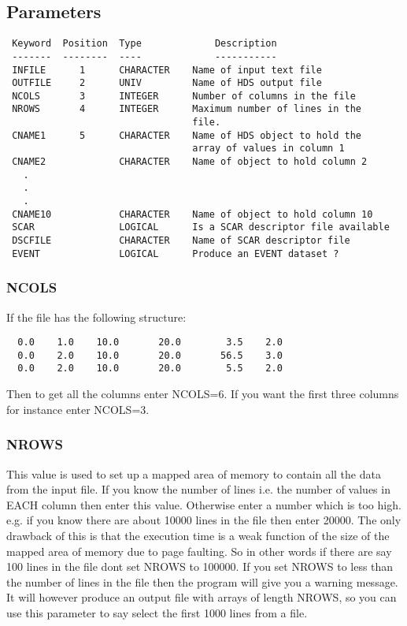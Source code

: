 \documentclass{book}
\renewcommand{\_}{{\tt\char'137}}     %
\begin{document}
\subsection{Parameters}
\begin{verbatim}
 Keyword  Position  Type             Description
 -------  --------  ----             -----------
 INFILE      1      CHARACTER    Name of input text file
 OUTFILE     2      UNIV         Name of HDS output file
 NCOLS       3      INTEGER      Number of columns in the file
 NROWS       4      INTEGER      Maximum number of lines in the
                                 file.
 CNAME1      5      CHARACTER    Name of HDS object to hold the
                                 array of values in column 1
 CNAME2             CHARACTER    Name of object to hold column 2
   .
   .
   .
 CNAME10            CHARACTER    Name of object to hold column 10
 SCAR               LOGICAL      Is a SCAR descriptor file available
 DSCFILE            CHARACTER    Name of SCAR descriptor file
 EVENT              LOGICAL      Produce an EVENT dataset ?

\end{verbatim}\subsubsection{NCOLS}
If the file has the following structure:
\begin{verbatim}
  0.0    1.0    10.0       20.0        3.5    2.0
  0.0    2.0    10.0       20.0       56.5    3.0
  0.0    2.0    10.0       20.0        5.5    2.0
\end{verbatim}
Then to get all the columns enter NCOLS=6.
If you want the first three columns for instance enter NCOLS=3.

\subsubsection{NROWS}
This value is used to set up a mapped area of memory to contain all
the data from the input file. If you know the number of lines i.e.
the number of values in EACH column then enter this value. Otherwise
enter a number which is too high. e.g. if you know there are
about 10000 lines in the file then enter 20000. The only drawback of this
is that the execution time is a weak function of the size of the mapped
area of memory due to page faulting. So in other words if there are
say 100 lines in the file dont set NROWS to 100000. If you set NROWS to
less than the number of lines in the file then the program will
give you a warning message. It will however produce an output file
with arrays of length NROWS, so you can use this parameter to say
select the first 1000 lines from a file.
\end{document}
